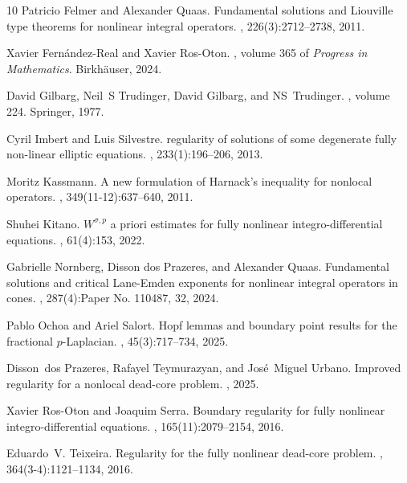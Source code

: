 \documentclass[11pt]{article}
\begin{document}
\begin{thebibliography}{10}
Patricio Felmer and Alexander Quaas.
\newblock Fundamental solutions and {L}iouville type theorems for nonlinear integral operators.
, 226(3):2712--2738, 2011.

Xavier Fern{\'a}ndez-Real and Xavier Ros-Oton.
, volume 365 of {\em Progress in Mathematics}.
\newblock Birkh{\"a}user, 2024.

David Gilbarg, Neil~S Trudinger, David Gilbarg, and NS~Trudinger.
, volume 224.
\newblock Springer, 1977.

Cyril Imbert and Luis Silvestre.
 regularity of solutions of some degenerate fully non-linear elliptic equations.
, 233(1):196--206, 2013.

Moritz Kassmann.
\newblock A new formulation of {H}arnack's inequality for nonlocal operators.
, 349(11-12):637--640, 2011.

Shuhei Kitano.
\newblock ${W}^{\sigma,p}$ a priori estimates for fully nonlinear integro-differential equations.
, 61(4):153, 2022.

Gabrielle Nornberg, Disson dos Prazeres, and Alexander Quaas.
\newblock Fundamental solutions and critical {L}ane-{E}mden exponents for nonlinear integral operators in cones.
, 287(4):Paper No. 110487, 32, 2024.

Pablo Ochoa and Ariel Salort.
\newblock Hopf lemmas and boundary point results for the fractional {$p$}-{L}aplacian.
, 45(3):717--734, 2025.

Disson~dos Prazeres, Rafayel Teymurazyan, and Jos{\'e}~Miguel Urbano.
\newblock Improved regularity for a nonlocal dead-core problem.
, 2025.

Xavier Ros-Oton and Joaquim Serra.
\newblock Boundary regularity for fully nonlinear integro-differential equations.
, 165(11):2079--2154, 2016.

Eduardo~V. Teixeira.
\newblock Regularity for the fully nonlinear dead-core problem.
, 364(3-4):1121--1134, 2016.

\end{thebibliography}
\end{document}
